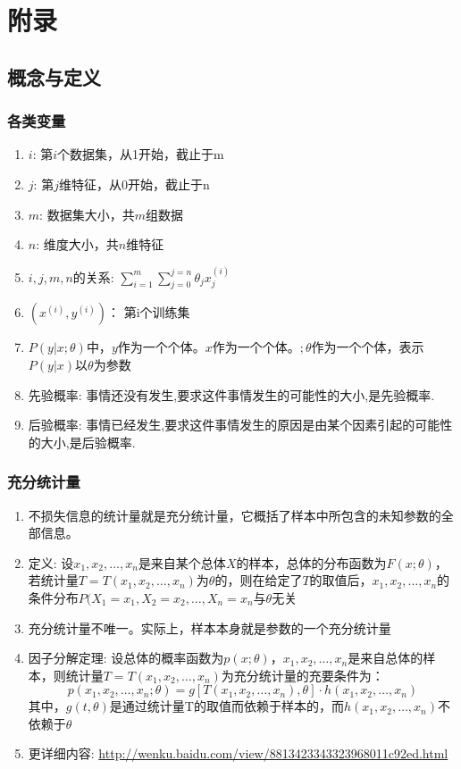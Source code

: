 \section{附录}
\subsection{概念与定义}
\subsubsection{各类变量}
\begin{enumerate}
	\item $i$: 第$i$个数据集，从1开始，截止于m
	\item $j$: 第$j$维特征，从0开始，截止于n
	\item $m$: 数据集大小，共$m$组数据
	\item $n$: 维度大小，共$n$维特征
	\item $i, j, m, n$的关系: $\sum_{i=1}^{m}\sum_{j=0}^{j=n}{\theta_{j}x_j^{(i)}}$
	\item $(x^{(i)}, y^{(i)})$： 第i个训练集
	\item $P(y|x;\theta)$中，$y$作为一个个体。$x$作为一个个体。$;\theta$作为一个个体，表示$P(y|x)$以$\theta$为参数
	\item 先验概率: 事情还没有发生,要求这件事情发生的可能性的大小,是先验概率. 
	\item 后验概率: 事情已经发生,要求这件事情发生的原因是由某个因素引起的可能性的大小,是后验概率.
\end{enumerate}

\subsubsection{充分统计量}
\begin{enumerate}
	\item 不损失信息的统计量就是充分统计量，它概括了样本中所包含的未知参数的全部信息。
	\item 定义: 设$x_1, x_2, \dots, x_n$是来自某个总体$X$的样本，总体的分布函数为$F(x;\theta)$，若统计量$T=T(x_1, x_2, \dots, x_n)$为$\theta$的{\color{blue}{充分统计量}}，则在给定了$T$的取值后，$x_1, x_2, \dots, x_n$的条件分布$P(X_1=x_1, X_2=x_2, \dots, X_n=x_n$与$\theta$无关
	\item 充分统计量不唯一。实际上，样本本身就是参数的一个充分统计量
	\item 因子分解定理{\color{red}{（没看懂）}}: 设总体的概率函数为$p(x;\theta)$，$x_1, x_2, \dots, x_n$是来自总体的样本，则统计量$T=T(x_1, x_2, \dots, x_n)$为充分统计量的充要条件为：
	\begin{equation}
		p(x_1, x_2, \dots, x_n;\theta) = g\left[T(x_1, x_2, \dots, x_n),\theta\right]\cdot h(x_1, x_2, \dots, x_n)
	\end{equation}
	其中，$g(t,\theta)$是通过统计量T的取值而依赖于样本的，而$h(x_1, x_2, \dots, x_n)$不依赖于$\theta$
\item 更详细内容: \url{http://wenku.baidu.com/view/8813423343323968011c92ed.html}
\end{enumerate}

